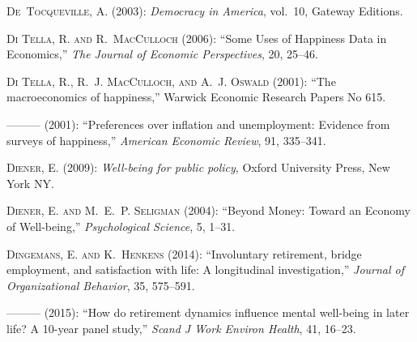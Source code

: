\textsc{De~Tocqueville, A.} (2003): \emph{Democracy in America}, vol.~10,
  Gateway Editions.

\textsc{{Di Tella}, R. and R.~MacCulloch} (2006): \enquote{Some Uses of
  Happiness Data in Economics,} \emph{The Journal of Economic Perspectives},
  20, 25--46.

\textsc{{Di Tella}, R., R.~J. MacCulloch, and A.~J. Oswald}
  (2001{}): \enquote{The macroeconomics of happiness,} Warwick
  Economic Research Papers No 615.

---\hspace{-.1pt}---\hspace{-.1pt}--- (2001{}):
  \enquote{Preferences over inflation and unemployment: Evidence from surveys
  of happiness,} \emph{American Economic Review}, 91, 335--341.

\textsc{Diener, E.} (2009): \emph{Well-being for public policy}, Oxford
  University Press, New York NY.

\textsc{Diener, E. and M.~E.~P. Seligman} (2004): \enquote{Beyond Money: Toward
  an Economy of Well-being,} \emph{Psychological Science}, 5, 1--31.

\textsc{Dingemans, E. and K.~Henkens} (2014): \enquote{Involuntary retirement,
  bridge employment, and satisfaction with life: A longitudinal investigation,}
  \emph{Journal of Organizational Behavior}, 35, 575--591.

---\hspace{-.1pt}---\hspace{-.1pt}--- (2015): \enquote{How do retirement dynamics influence mental well-being in later life? A 10-year panel study,}
  \emph{Scand J Work Environ Health}, 41, 16--23.

